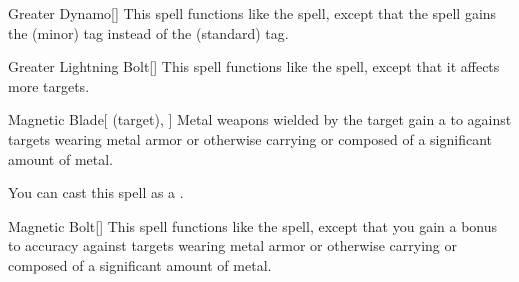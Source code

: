 \lowercase{\hypertarget{spell:Greater Dynamo}{}}\label{spell:Greater Dynamo}
\begin{freeability}[Rank 4]{\hypertarget{spell:Greater Dynamo}{Greater Dynamo}}[]
This spell functions like the  spell, except that the spell gains the  (minor) tag instead of the  (standard) tag.
\end{freeability}
\vspace{0.25em}



\lowercase{\hypertarget{spell:Greater Lightning Bolt}{}}\label{spell:Greater Lightning Bolt}
\begin{freeability}[Rank 4]{\hypertarget{spell:Greater Lightning Bolt}{Greater Lightning Bolt}}[]
This spell functions like the  spell, except that it affects more targets.
\end{freeability}
\vspace{0.25em}



\lowercase{\hypertarget{spell:Magnetic Blade}{}}\label{spell:Magnetic Blade}
\begin{attuneability}[Rank 4]{\hypertarget{spell:Magnetic Blade}{Magnetic Blade}}[ (target), ]
Metal weapons wielded by the target gain a   to  against targets wearing metal armor or otherwise carrying or composed of a significant amount of metal.

You can cast this spell as a .
\end{attuneability}
\vspace{0.25em}



\lowercase{\hypertarget{spell:Magnetic Bolt}{}}\label{spell:Magnetic Bolt}
\begin{freeability}[Rank 4]{\hypertarget{spell:Magnetic Bolt}{Magnetic Bolt}}[]
This spell functions like the  spell, except that you gain a  bonus to accuracy against targets wearing metal armor or otherwise carrying or composed of a significant amount of metal.
\end{freeability}
\vspace{0.25em}



